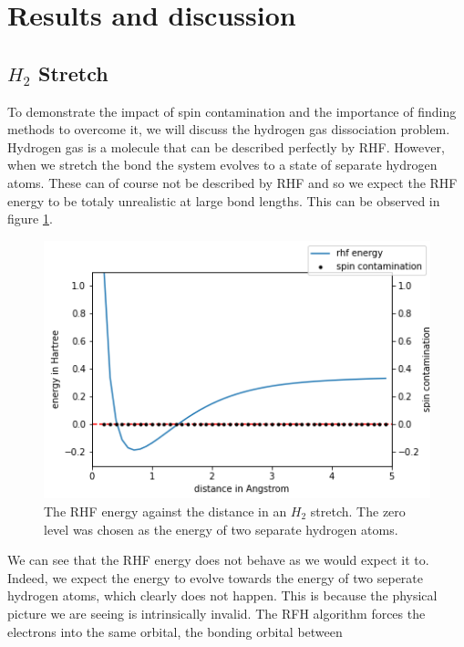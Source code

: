 \documentclass[twoside,twocolumn,9pt]{article}
\begin{document}
\section{Results and discussion}
\label{sec:results}

\subsection{$H_2$ Stretch}
\label{subsec:h2}
To demonstrate the impact of spin contamination and the importance of finding methods to overcome it, we will discuss the hydrogen gas dissociation problem\cite{Szabo1996}. Hydrogen
gas is a molecule that can be described perfectly by RHF. However, when we stretch the bond the system evolves to a state of separate hydrogen atoms. These can of course not be
described by RHF and so we expect the RHF energy to be totaly unrealistic at large bond lengths. This can be observed in figure \ref{fig:rhfstretch}.
\begin{center}
  \begin{figure}[h]
    \includegraphics[width=\linewidth]{./../notes/figures/rhf.png}
    \caption{The RHF energy against the distance in an $H_2$ stretch. The zero level was chosen as the energy of two separate hydrogen atoms.}
    \label{fig:rhfstretch}
  \end{figure}
\end{center}
We can see that the RHF energy does not behave as we would expect it to. Indeed, we expect the energy to evolve towards the energy of two seperate hydrogen atoms, which clearly does
not happen. This is because the physical picture we are seeing is intrinsically invalid. The RFH algorithm forces the electrons into the same orbital, the bonding orbital between
\end{document}
